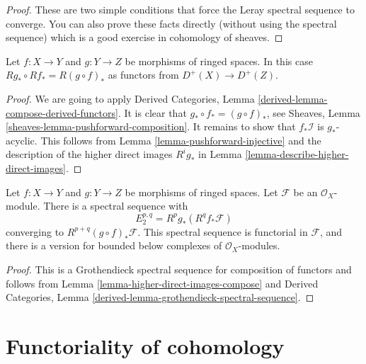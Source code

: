 \begin{proof}
These are two simple conditions that force the Leray spectral sequence to
converge. You can also prove these facts directly (without using the
spectral sequence) which is a good exercise in cohomology of sheaves.
\end{proof}

\begin{lemma}
\label{lemma-higher-direct-images-compose}
Let $f : X \to Y$ and $g : Y \to Z$ be morphisms of ringed spaces.
In this case $Rg_* \circ Rf_* = R(g \circ f)_*$ as functors
from $D^{+}(X) \to D^{+}(Z)$.
\end{lemma}

\begin{proof}
We are going to apply
Derived Categories, Lemma \ref{derived-lemma-compose-derived-functors}.
It is clear that $g_* \circ f_* = (g \circ f)_*$, see
Sheaves, Lemma \ref{sheaves-lemma-pushforward-composition}.
It remains to show that $f_*\mathcal{I}$ is $g_*$-acyclic.
This follows from Lemma \ref{lemma-pushforward-injective}
and the description of the
higher direct images $R^ig_*$ in
Lemma \ref{lemma-describe-higher-direct-images}.
\end{proof}

\begin{lemma}
\label{lemma-relative-Leray}
Let $f : X \to Y$ and $g : Y \to Z$ be morphisms of ringed spaces.
Let $\mathcal{F}$ be an $\mathcal{O}_X$-module.
There is a spectral sequence with
$$
E_2^{p, q} = R^pg_*(R^qf_*\mathcal{F})
$$
converging to $R^{p + q}(g \circ f)_*\mathcal{F}$.
This spectral sequence is functorial in $\mathcal{F}$, and there
is a version for bounded below complexes of $\mathcal{O}_X$-modules.
\end{lemma}

\begin{proof}
This is a Grothendieck spectral sequence for composition of functors
and follows from Lemma \ref{lemma-higher-direct-images-compose} and
Derived Categories, Lemma \ref{derived-lemma-grothendieck-spectral-sequence}.
\end{proof}














\section{Functoriality of cohomology}
\label{section-functoriality}

